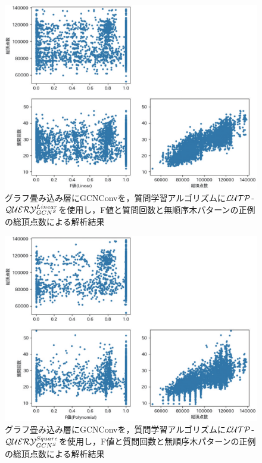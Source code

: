 \begin{figure}[tb]
  \centering
  \includegraphics[scale=0.66]{fig/fig-GCNConv_ln_ql_f1_nodes.eps}
  \caption{グラフ畳み込み層にGCNConvを，質問学習アルゴリズムに${\cal LUTP}$-${\cal QUERY}_{GCN^S}^{Linear}$を使用し，F値と質問回数と無順序木パターンの正例の総頂点数による解析結果}\label{fig:GCNConv_ln_ql_f1_nodes}
\end{figure}

\begin{figure}[tb]
  \centering
  \includegraphics[scale=0.66]{fig/fig-GCNConv_sqr_ql_f1_nodes.eps}
  \caption{グラフ畳み込み層にGCNConvを，質問学習アルゴリズムに${\cal LUTP}$-${\cal QUERY}_{GCN^S}^{Square}$を使用し，F値と質問回数と無順序木パターンの正例の総頂点数による解析結果}\label{fig:GCNConv_sqr_ql_f1_nodes}
\end{figure}
